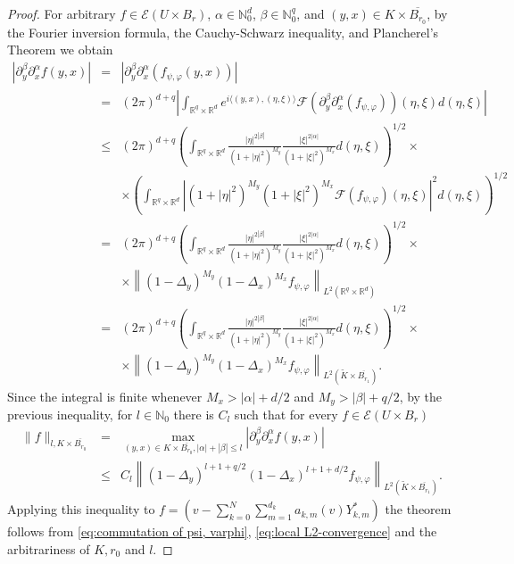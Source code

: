 \documentclass[a4paper,10pt]{amsart}
\newtheorem*{crucial lemma}{Lemma \ref{lem:nice polynomial2}}
\theoremstyle{definition}
\newcommand{\R}{\mathbb{R}}
\newcommand{\N}{\mathbb{N}}
\begin{document}
\begin{proof}
	For arbitrary $f\in\mathscr{E}(U\times B_r)$, $\alpha\in\N_0^d$, $\beta\in\N_0^q$, and $(y,x)\in K\times \overline{B_{r_0}}$, by the Fourier inversion formula, the Cauchy-Schwarz inequality, and Plancherel's Theorem we obtain
	\begin{eqnarray*}
		|\partial_y^\beta\partial_x^\alpha f(y,x)|&=&	|\partial_y^\beta\partial_x^\alpha \left(f_{\psi,\varphi}(y,x)\right)|\\
		&=&(2\pi)^{d+q}\left|\int_{\R^q\times\R^d}e^{i\langle (y,x),(\eta,\xi)\rangle}\mathscr{F}\left(\partial_y^\beta\partial_x^\alpha\left(f_{\psi,\varphi}\right)\right)(\eta,\xi)d(\eta,\xi)\right|\\
		&\leq&(2\pi)^{d+q}\left( \int_{\R^q\times\R^d} \frac{|\eta|^{2|\beta|}}{(1+|\eta|^2)^{M_y}}\frac{|\xi|^{2|\alpha|}}{(1+|\xi|^2)^{M_x}}d(\eta,\xi)\right)^{1/2}\times\\
		&&\times \left( \int_{\R^q\times\R^d} \left| (1+|\eta|^2)^{M_y}(1+|\xi|^2)^{M_x}\mathscr{F}(f_{\psi,\varphi})(\eta,\xi)\right|^2d(\eta,\xi)\right)^{1/2}\\
		&=&(2\pi)^{d+q}\left( \int_{\R^q\times\R^d} \frac{|\eta|^{2|\beta|}}{(1+|\eta|^2)^{M_y}}\frac{|\xi|^{2|\alpha|}}{(1+|\xi|^2)^{M_x}}d(\eta,\xi)\right)^{1/2}\times\\
		&&\times\left\| (1-\Delta_y)^{M_y}(1-\Delta_x)^{M_x}f_{\psi,\varphi}\right\|_{L^2(\R^q\times\R^d)}\\
		&=&(2\pi)^{d+q}\left( \int_{\R^q\times\R^d} \frac{|\eta|^{2|\beta|}}{(1+|\eta|^2)^{M_y}}\frac{|\xi|^{2|\alpha|}}{(1+|\xi|^2)^{M_x}}d(\eta,\xi)\right)^{1/2}\times\\
		&&\times\left\| (1-\Delta_y)^{M_y}(1-\Delta_x)^{M_x}f_{\psi,\varphi}\right\|_{L^2(\tilde{K}\times\overline{B_{r_1}})}.
	\end{eqnarray*}
	Since the integral is finite whenever $M_x>|\alpha|+d/2$ and $M_y>|\beta|+q/2$, by the previous inequality, for $l\in \N_0$ there is $C_l$ such that for every $f\in\mathscr{E}(U\times B_r)$
	\begin{eqnarray*}
		\|f\|_{l,K\times\overline{B_{r_0}}}&=&\max_{(y,x)\in K\times\overline{B_{r_0}}, |\alpha|+|\beta|\leq l}|\partial_y^\beta\partial_x^\alpha f(y,x)|\\
		&\leq& C_l \left\| (1-\Delta_y)^{l+1+q/2}(1-\Delta_x)^{l+1+d/2}f_{\psi,\varphi}\right\|_{L^2(\tilde{K}\times\overline{B_{r_1}})}.
	\end{eqnarray*}
	Applying this inequality to $f=(v-\sum_{k=0}^N\sum_{m=1}^{d_k}a_{k,m}(v)Y_{k,m}^*)$ the theorem follows from \eqref{eq:commutation of psi, varphi}, \eqref{eq:local L2-convergence} and the arbitrariness of $K, r_0$ and $l$.
\end{proof}
\end{document}
